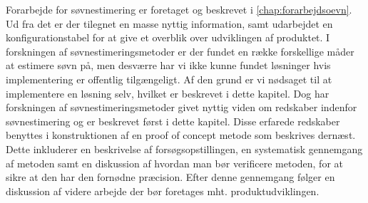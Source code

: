 Forarbejde for søvnestimering er foretaget og beskrevet i \cref{chap:forarbejdsoevn}.
Ud fra det er der tilegnet en masse nyttig information, samt udarbejdet en konfigurationstabel for at give et overblik over udviklingen af produktet.
I forskningen af søvnestimeringsmetoder er der fundet en række forskellige måder at estimere søvn på, men desværre har vi ikke kunne fundet løsninger hvis implementering er offentlig tilgængeligt.
Af den grund er vi nødsaget til at implementere en løsning selv, hvilket er beskrevet i dette kapitel.
Dog har forskningen af søvnestimeringsmetoder givet nyttig viden om redskaber indenfor søvnestimering og er beskrevet først i dette kapitel.
Disse erfarede redskaber benyttes i konstruktionen af en proof of concept metode som beskrives dernæst.
Dette inkluderer en beskrivelse af forsøgsopstillingen, en systematisk gennemgang af metoden samt en diskussion af hvordan man bør verificere metoden, for at sikre at den har den fornødne præcision.
Efter denne gennemgang følger en diskussion af videre arbejde der bør foretages mht. produktudviklingen.








